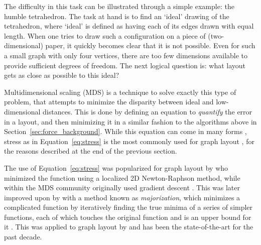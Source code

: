 The difficulty in this task can be illustrated through a simple example: the humble tetrahedron. The task at hand is to find an `ideal' drawing of the tetrahedron, where `ideal' is defined as having each of its edges drawn with equal length. When one tries to draw such a configuration on a piece of (two-dimensional) paper, it quickly becomes clear that it is not possible.
Even for such a small graph with only four vertices, there are too few dimensions available to provide sufficient degrees of freedom.
The next logical question is: what layout gets as close as possible to this ideal?

Multidimensional scaling (MDS) is a technique to solve exactly this type of problem, that attempts to minimize the disparity between ideal and low-dimensional distances.
This is done by defining an equation to \emph{quantify} the error in a layout, and then minimizing it in a similar fashion to the algorithms above in Section~\ref{sec:force_background}. While this equation can come in many forms \citep{Cox2000}, stress as in Equation~\eqref{eq:stress} is the most commonly used for graph layout \citep{Brandes2008}, for the reasons described at the end of the previous section.

The use of Equation~\eqref{eq:stress} was popularized for graph layout by \citet{Kamada1989} who minimized the function using a localized 2D Newton-Raphson method, while within the MDS community \citet{Kruskal1964Optimizing} originally used gradient descent \citep{Kruskal1964Numerical}. This was later improved upon by \citet{DeLeeuw1988} with a method known as \emph{majorization},
which minimizes a complicated function by iteratively finding the 
true minima of a series of simpler functions, each of which touches the 
original function and is an upper bound for it \citep{Cox2000}.
This was applied to graph layout by \citet{Gansner2004} and has been the state-of-the-art for the past decade.

